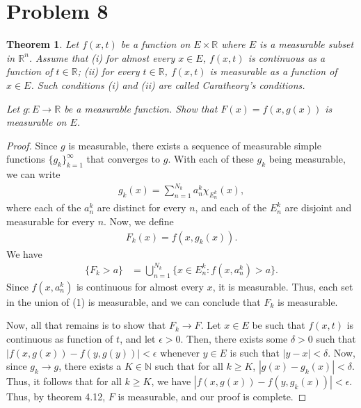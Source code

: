 \documentclass[10pt,a4paper]{article}
\theoremstyle{theorem}
\newtheorem{theorem}{Theorem}
\theoremstyle{definition}
\begin{document}
\section*{Problem 8}
\begin{theorem}
Let $f(x, t)$ be a function on $E \times \mathbb{R}$ where $E$ is a measurable subset in $\mathbb{R}^n$. Assume that (i) for almost every $x \in E$, $f(x, t)$ is continuous as a function of $t \in \mathbb{R}$; (ii) for every $t \in \mathbb{R}$, $f(x, t)$ is measurable as a function of $x \in E$. Such conditions (i) and (ii) are called Caratheory's conditions.

Let $g: E \to \mathbb{R}$ be a measurable function. Show that $F(x) = f(x, g(x))$ is measurable on $E$.
\end{theorem}

\begin{proof}
Since $g$ is measurable, there exists a sequence of measurable simple functions $\{g_k\}_{k=1}^\infty$ that converges to $g$. With each of these $g_k$ being measurable, we can write
\begin{align*}
g_k(x) = \sum_{n=1}^{N_k} a^k_n \chi_{E^k_n}(x),
\end{align*}
where each of the $a^k_n$ are distinct for every $n$, and each of the $E^k_n$ are disjoint and measurable for every $n$. Now, we define 
\begin{align*}
F_k(x) = f(x, g_k(x)).
\end{align*}
We have
\begin{align}
\{F_k > a \} &= \bigcup_{n=1}^{N_k} \{x \in E^k_n: f(x, a^k_n) > a\}.
\end{align}
Since $f(x, a^k_n)$ is continuous for almost every $x$, it is measurable. Thus,  each set in the union of (1) is measurable, and we can conclude that $F_k$ is measurable.

Now, all that remains is to show that $F_k \to F$. Let $x \in E$ be such that $f(x, t)$ is continuous as function of $t$, and let $\epsilon > 0$. Then, there exists some $\delta > 0$ such that $|f(x, g(x)) - f(y, g(y))| < \epsilon$ whenever $y \in E$ is such that $|y - x| < \delta$. Now, since $g_k \to g$, there exists a $K \in \mathbb{N}$ such that for all $k \geq K$, $|g(x) - g_k(x)| < \delta$. Thus, it follows that for all $k \geq K$, we have $|f(x, g(x)) - f(y, g_k(x))| < \epsilon$. Thus, by theorem 4.12, $F$ is measurable, and our proof is complete.
\end{proof}
\end{document}
